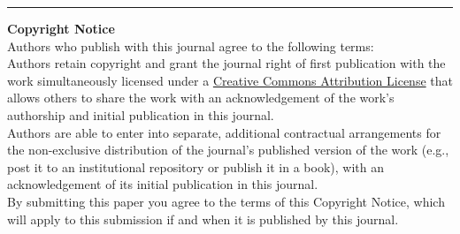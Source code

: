 \documentclass{jors}
\begin{document}




\printbibliography %

\vspace{2cm}

\rule{\textwidth}{1pt}

{ \bf Copyright Notice} \\
Authors who publish with this journal agree to the following terms: \\

Authors retain copyright and grant the journal right of first publication with the work simultaneously licensed under a  \href{http://creativecommons.org/licenses/by/3.0/}{Creative Commons Attribution License} that allows others to share the work with an acknowledgement of the work's authorship and initial publication in this journal. \\

Authors are able to enter into separate, additional contractual arrangements for the non-exclusive distribution of the journal's published version of the work (e.g., post it to an institutional repository or publish it in a book), with an acknowledgement of its initial publication in this journal. \\

By submitting this paper you agree to the terms of this Copyright Notice, which will apply to this submission if and when it is published by this journal.
\end{document}
